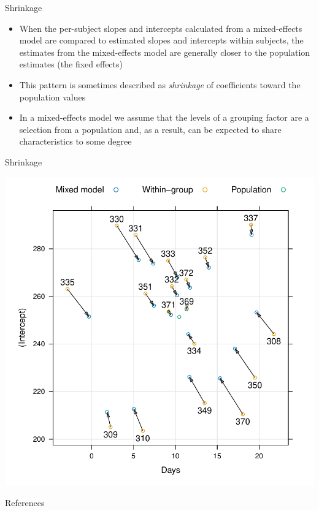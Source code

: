 \documentclass[aspectratio=169]{beamer}
\begin{document}
\begin{frame}{Shrinkage}
  \begin{itemize}
    \item When the per-subject slopes and intercepts calculated from a
      mixed-effects model are compared to estimated slopes and intercepts
      within subjects, the estimates from the mixed-effects model are
      generally closer to the population estimates (the fixed effects)
    \item This pattern is sometimes described as {\it shrinkage} of
      coefficients toward the population values
    \item In a mixed-effects model we assume that the levels of a grouping
      factor are a selection from a population and, as a result, can be
      expected to share characteristics to some degree
  \end{itemize}
\end{frame}

\begin{frame}{Shrinkage}
  \begin{center}
    \includegraphics[scale=.48]{../figures/sleep_shrinkage}
  \end{center}
\end{frame}

% 
% 
% 

\appendix

\begin{frame}{References}
  \printbibliography
  \vfill
\end{frame}
\end{document}
